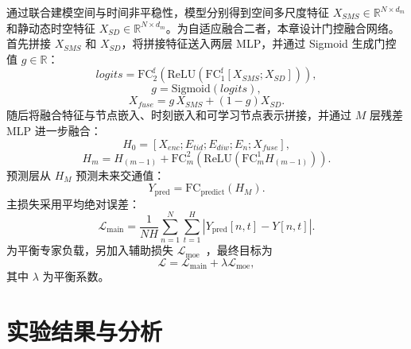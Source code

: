 通过联合建模空间与时间非平稳性，模型分别得到空间多尺度特征 $X_{SMS}\in\mathbb{R}^{N\times d_m}$ 和静动态时空特征 $X_{SD}\in\mathbb{R}^{N\times d_m}$。为自适应融合二者，本章设计门控融合网络。首先拼接 $X_{SMS}$ 和 $X_{SD}$，将拼接特征送入两层 MLP，并通过 Sigmoid 生成门控值 $g\in\mathbb{R}$：
\begin{equation}
    logits=\mathrm{FC}_2^{\mathrm{f}}\!\left(\mathrm{ReLU}\!\left(\mathrm{FC}_1^{\mathrm{f}}\left[X_{SMS};X_{SD}\right]\right)\right),
\end{equation}
\begin{equation}
    g=\mathrm{Sigmoid}\!\left(logits\right),
\end{equation}
\begin{equation}
    X_{fuse}=g\,X_{SMS}+\left(1-g\right)X_{SD}.
\end{equation}
随后将融合特征与节点嵌入、时刻嵌入和可学习节点表示拼接，并通过 $M$ 层残差 MLP 进一步融合：
\begin{equation}
H_0=\left[X_{enc};E_{tid};E_{diw};E_n;X_{fuse}\right],
\end{equation}
\begin{equation}
H_m=H_{(m-1)}+\mathrm{FC}^2_{m}\!\left(\mathrm{ReLU}\!\left(\mathrm{FC}^1_{m}H_{(m-1)}\right)\right).
\end{equation}
预测层从 $H_M$ 预测未来交通值：
\begin{equation}
Y_\mathrm{pred}=\mathrm{FC}_{\mathrm{predict}}\!\left(H_M\right).
\end{equation}
主损失采用平均绝对误差：
\begin{equation}
\mathcal{L}_{\mathrm{main}}=\frac{1}{NH}\sum_{n=1}^{N}\sum_{t=1}^{H}\left|Y_\mathrm{pred}[n,t]-Y[n,t]\right|.
\end{equation}
为平衡专家负载，另加入辅助损失 $\mathcal{L}_{\mathrm{moe}}$~\cite{moe}，最终目标为
\begin{equation}
\mathcal{L}=\mathcal{L}_{\mathrm{main}}+\lambda\mathcal{L}_{\mathrm{moe}},
\end{equation}
其中 $\lambda$ 为平衡系数。



\section{实验结果与分析}

